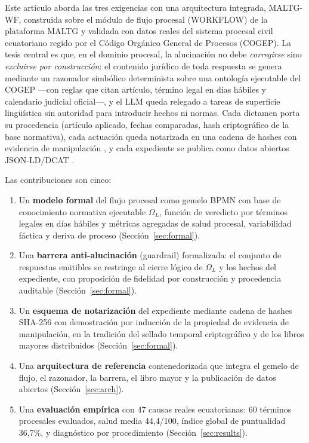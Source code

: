 \documentclass[computers,article,submit,pdftex,moreauthors]{Definitions/mdpi}
\begin{document}
Este artículo aborda las tres exigencias con una arquitectura integrada, MALTG-WF, construida sobre el módulo de flujo procesal (WORKFLOW) de la plataforma MALTG y validada con datos reales del sistema procesal civil ecuatoriano regido por el Código Orgánico General de Procesos (COGEP). La tesis central es que, en el dominio procesal, la alucinación no debe \emph{corregirse} sino \emph{excluirse por construcción}: el contenido jurídico de toda respuesta se genera mediante un razonador simbólico determinista sobre una ontología ejecutable del COGEP ---con reglas que citan artículo, término legal en días hábiles y calendario judicial oficial---, y el LLM queda relegado a tareas de superficie lingüística sin autoridad para introducir hechos ni normas. Cada dictamen porta su procedencia (artículo aplicado, fechas comparadas, hash criptográfico de la base normativa), cada actuación queda notarizada en una cadena de hashes con evidencia de manipulación \cite{Haber1991}, y cada expediente se publica como datos abiertos JSON-LD/DCAT \cite{Bizer2009,Guha2016}.

Las contribuciones son cinco:
\begin{enumerate}
\item Un \textbf{modelo formal} del flujo procesal como gemelo BPMN con base de conocimiento normativa ejecutable $\Omega_{L}$, función de veredicto por términos legales en días hábiles y métricas agregadas de salud procesal, variabilidad fáctica y deriva de proceso (Sección~\ref{sec:formal}).
\item Una \textbf{barrera anti-alucinación} (guardrail) formalizada: el conjunto de respuestas emitibles se restringe al cierre lógico de $\Omega_{L}$ y los hechos del expediente, con proposición de fidelidad por construcción y procedencia auditable (Sección~\ref{sec:formal}).
\item Un \textbf{esquema de notarización} del expediente mediante cadena de hashes SHA-256 con demostración por inducción de la propiedad de evidencia de manipulación, en la tradición del sellado temporal criptográfico \cite{Haber1991} y de los libros mayores distribuidos \cite{Zheng2018,Casino2019} (Sección~\ref{sec:formal}).
\item Una \textbf{arquitectura de referencia} contenedorizada que integra el gemelo de flujo, el razonador, la barrera, el libro mayor y la publicación de datos abiertos (Sección~\ref{sec:arch}).
\item Una \textbf{evaluación empírica} con 47 causas reales ecuatorianas: 60 términos procesales evaluados, salud media 44{,}4/100, índice global de puntualidad 36{,}7\%, y diagnóstico por procedimiento (Sección~\ref{sec:results}).
\end{enumerate}
\end{document}
